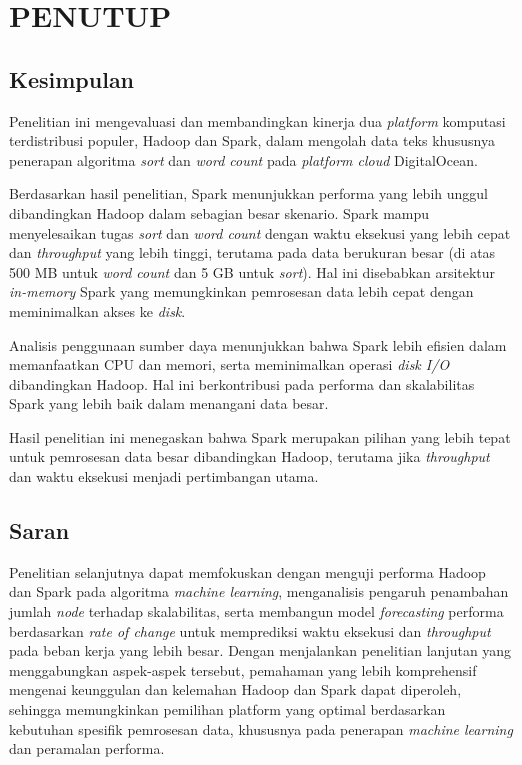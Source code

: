 \chapter{PENUTUP}

\section{Kesimpulan}
Penelitian ini mengevaluasi dan membandingkan kinerja dua \textit{platform} komputasi terdistribusi populer, Hadoop dan Spark, dalam mengolah data teks khususnya penerapan algoritma \textit{sort} dan \textit{word count} pada \textit{platform cloud} DigitalOcean. 

Berdasarkan hasil penelitian, Spark menunjukkan performa yang lebih unggul dibandingkan Hadoop dalam sebagian besar skenario. Spark mampu menyelesaikan tugas \textit{sort} dan \textit{word count} dengan waktu eksekusi yang lebih cepat dan \textit{throughput} yang lebih tinggi, terutama pada data berukuran besar (di atas 500 MB untuk \textit{word count} dan 5 GB untuk \textit{sort}). Hal ini disebabkan arsitektur \textit{in-memory} Spark yang memungkinkan pemrosesan data lebih cepat dengan meminimalkan akses ke \textit{disk}.

Analisis penggunaan sumber daya menunjukkan bahwa Spark lebih efisien dalam memanfaatkan CPU dan memori, serta meminimalkan operasi \textit{disk I/O} dibandingkan Hadoop.  Hal ini berkontribusi pada performa dan skalabilitas Spark yang lebih baik dalam menangani data besar. 

Hasil penelitian ini menegaskan bahwa Spark merupakan pilihan yang lebih tepat untuk pemrosesan data besar dibandingkan Hadoop, terutama jika \textit{throughput} dan waktu eksekusi menjadi pertimbangan utama. 

\section{Saran}
Penelitian selanjutnya dapat memfokuskan dengan menguji performa Hadoop dan Spark pada algoritma \textit{machine learning}, menganalisis pengaruh penambahan jumlah \textit{node} terhadap skalabilitas, serta membangun model \textit{forecasting} performa berdasarkan \textit{rate of change} untuk memprediksi waktu eksekusi dan \textit{throughput} pada beban kerja yang lebih besar. Dengan menjalankan penelitian lanjutan yang menggabungkan aspek-aspek tersebut, pemahaman yang lebih komprehensif mengenai keunggulan dan kelemahan Hadoop dan Spark dapat diperoleh, sehingga memungkinkan pemilihan platform yang optimal berdasarkan kebutuhan spesifik pemrosesan data, khususnya pada penerapan \textit{machine learning} dan peramalan performa.